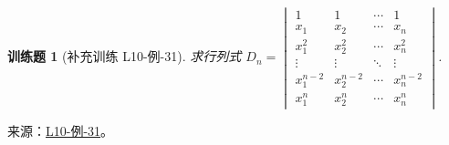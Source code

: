 \documentclass[UTF8,12pt,a4paper,fontset=fandol]{ctexart}
\newtheorem{exercise}{训练题}[section]
\begin{document}
\begin{exercise}[补充训练 L10-例-31]\label{prob:L10-例-31}
求行列式 $D_n=\begin{vmatrix}
            1         & 1         & \cdots & 1         \\
            x_1       & x_2       & \cdots & x_n       \\
            x_1^{2}   & x_2^{2}   & \cdots & x_n^{2}   \\
            \vdots    & \vdots    & \ddots & \vdots    \\
            x_1^{n-2} & x_2^{n-2} & \cdots & x_n^{n-2} \\
            x_1^{n}   & x_2^{n}   & \cdots & x_n^{n}
        \end{vmatrix}$.
\end{exercise}
\noindent 来源：\href{https://github.com/yhwu-is/Linear-Algebra-Left-Undone/blob/new/%E8%AE%B2%E4%B9%89/%E4%B8%93%E9%A2%98/10%20%E8%A1%8C%E5%88%97%E5%BC%8F.tex}{L10-例-31}。
\end{document}
